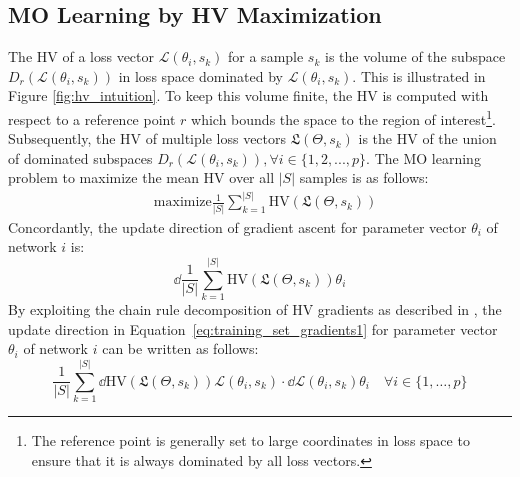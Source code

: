 \subsection{MO Learning by HV Maximization}
The HV of a loss vector  $\mathcal{L}(\theta_{i},s_{k})$ for a sample $s_{k}$ is the volume of the subspace $D_{r}(\mathcal{L}(\theta_{i},s_{k}))$ in loss space dominated by $\mathcal{L}(\theta_{i},s_{k})$. This is illustrated in Figure \ref{fig:hv_intuition}. To keep this volume finite, the HV is computed with respect to a reference point $r$ which bounds the space to the region of interest\footnote{The reference point is generally set to large coordinates in loss space to ensure that it is always dominated by all loss vectors.}. Subsequently, the HV of multiple loss vectors $\mathfrak{L}(\Theta,s_{k})$ is the HV of the union of dominated subspaces $D_{r}(\mathcal{L}(\theta_{i},s_{k})), \forall i \in \{1, 2, ..., p\}$. The MO learning problem to maximize the mean HV over all $|S|$ samples is as follows:
\begin{align}
    &\text{maximize} \frac{1}{|S|}\sum_{k=1}^{|S|}\mathrm{HV}\left(\mathfrak{L}(\Theta,s_{k})\right)\label{eq:max_mean_hv}
\end{align}
Concordantly, the update direction of gradient ascent for parameter vector $\theta_{i}$ of network $i$ is:
\begin{equation}
\dd{\frac{1}{|S|}\sum_{k=1}^{|S|}\mathrm{HV}(\mathfrak{L}(\Theta,s_{k}))}{\theta_{i}} \label{eq:training_set_gradients1}
\end{equation}
By exploiting the chain rule decomposition of HV gradients as described in \cite{emmerich2014time}, the update direction in Equation~\eqref{eq:training_set_gradients1} for parameter vector $\theta_{i}$ of network $i$ can be written as follows:
\begin{equation}
\frac{1}{|S|} \sum_{k=1}^{|S|}\dd{\mathrm{HV}\left( \mathfrak{L}(\Theta,s_{k}) \right)}{\mathcal{L}(\theta_{i},s_{k})}\cdot\dd{\mathcal{L}(\theta_{i},s_{k})}{\theta_{i}} \quad\forall i\in\{1,\dots,p\} \label{eq:training_set_gradients_dot_product}
\end{equation}

